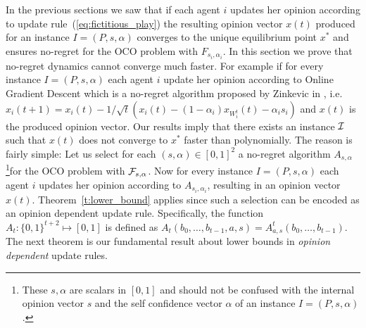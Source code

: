 In the previous sections we saw that if each
agent $i$ updates her opinion according to
update rule~(\ref{eq:fictitious_play})
the resulting opinion vector $x(t)$ produced
for an instance $I=(P,s,\alpha)$ converges
to the unique equilibrium point $x^*$ and
ensures no-regret for the OCO problem
with $F_{s_i,\alpha_i}$. In this section we
prove that no-regret dynamics cannot converge much
faster. For example if for every instance
$I=(P,s,\alpha)$ each agent $i$ update her opinion according
to Online Gradient Descent which is a no-regret algorithm
proposed by Zinkevic in \cite{Z03}, i.e.
$x_i(t+1)= x_i(t) - 1/\sqrt{t}(x_i(t)-(1-\alpha_i)x_{W_i^t}(t)-\alpha_is_i)$
and $x(t)$ is the produced opinion vector.
Our results imply that there exists an instance $\mathcal{I}$
such that $x(t)$ does not converge to $x^*$ faster than polynomially.
The reason is fairly simple: Let us select
for each $(s,\alpha) \in [0,1]^2$ a no-regret algorithm
$A_{s,\alpha}$\footnote{
These $s,\alpha$ are scalars in $[0,1]$ and
should not be confused with the internal opinion vector $s$
and the self confidence vector $\alpha$ of an instance $I=(P,s,\alpha)$.}for the OCO problem with
$\mathcal{F}_{s,\alpha}$. Now for every instance $I=(P,s,\alpha)$ each agent $i$ updates her
opinion according to $A_{s_i,\alpha_i}$,
resulting in an opinion vector $x(t)$.
Theorem~\ref{t:lower_bound} applies since such a selection
can be encoded as an opinion dependent update rule.
Specifically, the function $A_t:\{0,1\}^{t+2} \mapsto [0,1]$ is defined
as $A_t(b_0,\ldots,b_{t-1},a,s) = A^t_{a,s}(b_0,\ldots,b_{t-1})$.
The next theorem is our fundamental result about lower bounds in
\emph{opinion dependent} update rules.

